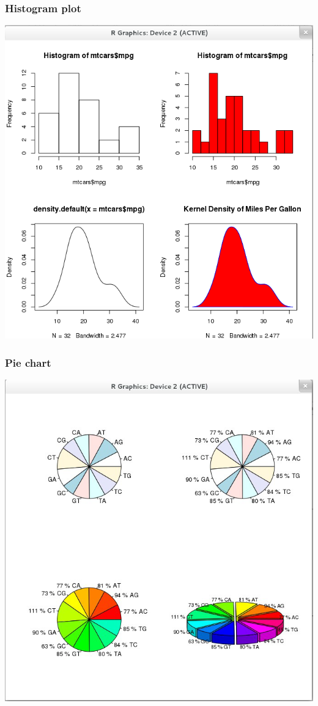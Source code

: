 \documentclass[12pt]{beamer}
\begin{document}
\begin{frame}[fragile]
\frametitle{Histogram plot}
\includegraphics[scale=0.35]{histogram}
\end{frame}


\begin{frame}[fragile]
\frametitle{Pie chart}
\includegraphics[scale=0.35]{piechart}
\end{frame}
\end{document}

